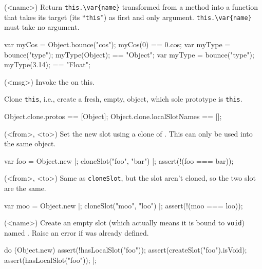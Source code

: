 \begin{urbiscriptapi}
\item[bounce](<name>)%
  Return \lstinline|this.\var{name}| transformed from a method into a
  function that takes its target (its ``\lstinline|this|'') as first
  and only argument.  \lstinline|this.\var{name}| must take no
  argument.
\begin{urbiassert}
{ var myCos = Object.bounce("cos"); myCos(0) }    == 0.cos;
{ var myType = bounce("type"); myType(Object); } == "Object";
{ var myType = bounce("type"); myType(3.14); }   == "Float";
\end{urbiassert}

\item[callMessage](<msg>)%
  Invoke the   on this.
\item[clone]
  Clone \lstinline|this|, i.e., create a fresh, empty, object, which
  sole prototype is \lstinline|this|.
\begin{urbiassert}
Object.clone.protos == [Object];
Object.clone.localSlotNames == [];
\end{urbiassert}

\item[cloneSlot](<from>, <to>)%
  Set the new slot  using a clone of . This can only
  be used into the same object.

\begin{urbiscript}
var foo = Object.new |;
cloneSlot("foo", "bar") |;
assert(!(foo === bar));
\end{urbiscript}

\item[copySlot](<from>, <to>)%
  Same as \lstinline|cloneSlot|, but the slot aren't cloned, so the
  two slot are the same.
\begin{urbiscript}
var moo = Object.new |;
cloneSlot("moo", "loo") |;
assert(!(moo === loo));
\end{urbiscript}

\item[createSlot](<name>)%
  Create an empty slot (which actually means it is bound to
  \lstinline|void|) named .  Raise an error if 
  was already defined.
\begin{urbiscript}
do (Object.new)
{
  assert(!hasLocalSlot("foo"));
  assert(createSlot("foo").isVoid);
  assert(hasLocalSlot("foo"));
}|;
\end{urbiscript}


\end{urbiscriptapi}

